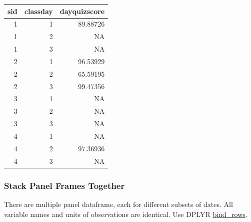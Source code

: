 \documentclass[
]{book}
\newenvironment{Shaded}{\begin{snugshade}}{\end{snugshade}}
\newcommand{\KeywordTok}[1]{\textcolor[rgb]{0.13,0.29,0.53}{\textbf{#1}}}
\newcommand{\NormalTok}[1]{#1}
\newcommand{\OperatorTok}[1]{\textcolor[rgb]{0.81,0.36,0.00}{\textbf{#1}}}
\newcommand{\StringTok}[1]{\textcolor[rgb]{0.31,0.60,0.02}{#1}}
\begin{document}
\begin{Shaded}
\end{Shaded}

\begin{table}[!h]
\centering
\begin{tabular}{r|r|r}
\hline
sid & classday & dayquizscore\\
\hline
\rowcolor{gray!6}  1 & 1 & 89.88726\\
\hline
1 & 2 & NA\\
\hline
\rowcolor{gray!6}  1 & 3 & NA\\
\hline
2 & 1 & 96.53929\\
\hline
\rowcolor{gray!6}  2 & 2 & 65.59195\\
\hline
2 & 3 & 99.47356\\
\hline
\rowcolor{gray!6}  3 & 1 & NA\\
\hline
3 & 2 & NA\\
\hline
\rowcolor{gray!6}  3 & 3 & NA\\
\hline
4 & 1 & NA\\
\hline
\rowcolor{gray!6}  4 & 2 & 97.36936\\
\hline
4 & 3 & NA\\
\hline
\end{tabular}
\end{table}

\hypertarget{stack-panel-frames-together}{%
\subsubsection{Stack Panel Frames Together}\label{stack-panel-frames-together}}

There are multiple panel dataframe, each for different subsets of dates. All variable names and units of observations are identical. Use DPLYR \href{https://dplyr.tidyverse.org/reference/bind.html}{bind\_rows}.
\end{document}
